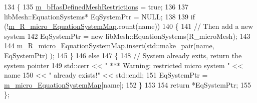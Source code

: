 \begin{DoxyCode}
134     \{
135         \hyperlink{classcarl_1_1assemble__coupling__matrices_aaed7135f088376664521b650c2b25fbd}{m\_bHasDefinedMeshRestrictions} = \textcolor{keyword}{true};
136 
137         libMesh::EquationSystems* EqSystemPtr = NULL;
138 
139         \textcolor{keywordflow}{if} (!\hyperlink{classcarl_1_1assemble__coupling__matrices_a5b7c4f9307a9611926dc1ccf8bb33d4b}{m\_R\_micro\_EquationSystemMap}.count(name))
140         \{
141             \textcolor{comment}{// Then add a new system}
142             EqSystemPtr = \textcolor{keyword}{new} libMesh::EquationSystems(R\_microMesh);
143 
144             \hyperlink{classcarl_1_1assemble__coupling__matrices_a5b7c4f9307a9611926dc1ccf8bb33d4b}{m\_R\_micro\_EquationSystemMap}.insert(std::make\_pair(name, EqSystemPtr)
      );
145         \}
146         \textcolor{keywordflow}{else}
147         \{
148             \textcolor{comment}{// System already exits, return the system pointer}
149             std::cerr << \textcolor{stringliteral}{" *** Warning: restricted micro system "} << name
150                     << \textcolor{stringliteral}{" already exists!"} << std::endl;
151             EqSystemPtr = \hyperlink{classcarl_1_1assemble__coupling__matrices_a13fddbcb853df9b7ce1a99062fb9f8b6}{m\_micro\_EquationSystemMap}[name];
152         \}
153 
154         \textcolor{keywordflow}{return} *EqSystemPtr;
155     \};
\end{DoxyCode}
\hypertarget{classcarl_1_1assemble__coupling__matrices_ac8e2ab74817605feb97044d794fc04c9}{}
